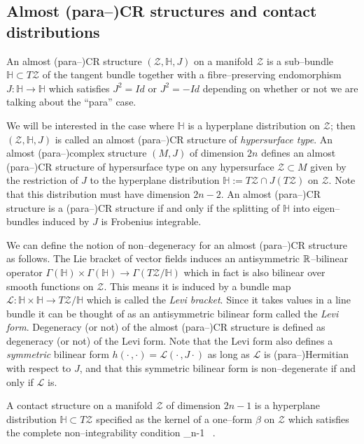 \subsection{Almost (para--)CR structures and contact distributions}

\begin{defi}
An almost (para--)CR structure $(\mathcal{Z},\mathbb{H} ,J)$ on a manifold $\mathcal{Z}$ is a sub--bundle $\mathbb{H} \subset T\mathcal{Z}$ of the tangent bundle together with a fibre--preserving endomorphism $J:\mathbb{H} \rightarrow \mathbb{H} $ which satisfies $J^2=Id$ or $J^2=-Id$ depending on whether or not we are talking about the ``para'' case.
\end{defi}

We will be interested in the case where $ \mathbb{H} $ is a hyperplane distribution on $\mathcal{Z}$; then $(\mathcal{Z}, \mathbb{H} ,J)$ is called an almost (para--)CR structure of \textit{hypersurface type}. An almost (para--)complex structure $(M,J)$ of dimension $2n$ defines an almost (para--)CR structure of hypersurface type on any hypersurface $\mathcal{Z}\subset M$ given by the restriction of $J$ to the hyperplane distribution $ \mathbb{H} :=T\mathcal{Z}\cap J(T\mathcal{Z})$ on $\mathcal{Z}$. Note that this distribution must have dimension $2n-2$. An almost (para--)CR structure is a (para--)CR structure if and only if the splitting of $ \mathbb{H} $ into eigen--bundles induced by $J$ is Frobenius integrable.

We can define the notion of non--degeneracy for an almost (para--)CR structure as follows. The Lie bracket of vector fields induces an antisymmetric $\mathbb{R}$--bilinear operator $\Gamma( \mathbb{H} )\times\Gamma( \mathbb{H} )\rightarrow\Gamma(T\mathcal{Z}/ \mathbb{H} )$ which in fact is also bilinear over smooth functions on $\mathcal{Z}$. This means it is induced by a bundle map $\mathcal{L}: \mathbb{H} \times \mathbb{H} \rightarrow T\mathcal{Z}/ \mathbb{H} $ which is called the \textit{Levi bracket}. Since it takes values in a line bundle it can be thought of as an antisymmetric bilinear form called the \textit{Levi form}. Degeneracy (or not) of the almost (para--)CR structure is defined as degeneracy (or not) of the Levi form. Note that the Levi form also defines a \textit{symmetric} bilinear form $h(\cdot\,,\cdot)=\mathcal{L}(\cdot\,,J\cdot)$ as long as $\mathcal{L}$ is (para--)Hermitian with respect to $J$, and that this symmetric bilinear form is non--degenerate if and only if $\mathcal{L}$ is.

\begin{defi}
A contact structure on a manifold $\mathcal{Z}$ of dimension $2n-1$ is a hyperplane distribution $ \mathbb{H} \subset T\mathcal{Z}$ specified as the kernel of a one--form $\beta$ on $\mathcal{Z}$ which satisfies the complete non--integrability condition
\be \label{eq:non_integrability}
\beta\wedge {}_{n-1\ } .
\ee
\end{defi}

